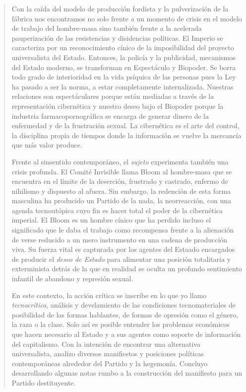 \documentclass{scrbook}
\begin{document}
\begin{quotation}
    Con la caída del modelo de producción fordista y la pulverización de la fábrica nos encontramos no solo frente a un momento de crisis en el modelo de trabajo del hombre-masa sino también frente a la acelerada pauperización de las resistencias y disidencias políticas. El Imperio se caracteriza por un reconocimiento cínico de la imposibilidad del proyecto universalista del Estado. Entonces, la policía y la publicidad, mecanismos del Estado moderno, se transforman en Espectáculo y Biopoder. Se borra todo grado de interioridad en la vida psíquica de las personas pues la Ley ha pasado a ser la norma, a estar completamente internalizada. Nuestras relaciones son espectáculares porque están mediadas a través de la representación cibernética y nuestro deseo bajo el Biopoder porque la industria farmacopornográfica se encarga de generar dinero de la enfermedad y de la frustración sexual. La cibernética es el arte del control, la disciplina propia de tiempos donde la información se vuelve la mercancía que más valor produce.

    Frente al sinsentido contemporáneo, el \emph{sujeto} experimenta también una crisis profunda. El Comité Invisible llama Bloom al hombre-masa que se encuentra en el límite de la deserción, frustrado y castrado, enfermo de nihilismo y dispuesto al afuera. Sin embargo, la redención de esta forma masculina ha producido un Partido de la nada, la neorreacción, con una agenda tecnoutópica cuyo fin es hacer total el poder de la cibernética imperial. El Bloom es un hombre cínico que ha perdido incluso el significado que le daba el trabajo como recompensa frente a la alienación de verse reducido a un mero instrumento en una cadena de producción viva. Su fuerza vital es capturada por los agentes del Estaado encargados de producir el \emph{deseo de Estado} para alimentar una posición totalitaria y exterminista detrás de la que en realidad se oculta un profundo sentimiento infantil de abandono y represión sexual.

    En este contexto, la acción crítica se inscribe en lo que yo llamo \emph{tecnocrítica}, análisis y develamiento de las condiciones tecnomateriales de posibilidad de las formas hablantes, de formas de opresión como el género, la raza o la clase. Solo así es posible entender los problemas económicos que hacen necesario al Estado y a sus agentes como soporte de información del capitalismo. Con la intención de encontrar una alternativa universalista, analizo diversos manifiestos y posiciones políticas contemporáneas alrededor del Partido y la hegemonía. Concluyo desarrollando algunas notas rumbo a la construcción del manifiesto para un Partido destituyente.
\end{quotation}
\end{document}
